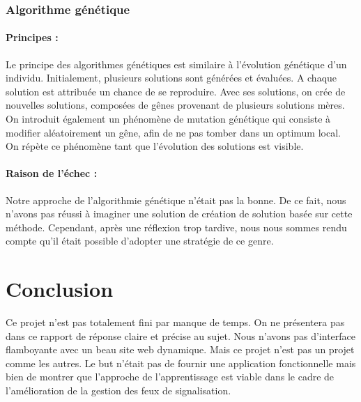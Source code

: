 \documentclass[11pt]{article}
\begin{document}
\subsubsection{Algorithme génétique}
\paragraph{Principes :}{
Le principe des algorithmes génétiques est similaire à l'évolution génétique d'un individu. Initialement, plusieurs solutions sont générées et évaluées. A chaque solution est attribuée un chance de se reproduire. Avec ses solutions, on crée de nouvelles solutions, composées de gênes provenant de plusieurs solutions mères. On introduit également un phénomène de mutation génétique qui consiste à modifier aléatoirement un gêne, afin de ne pas tomber dans un optimum local.
On répète ce phénomène tant que l'évolution des solutions est visible. 
}
\paragraph{Raison de l'échec :}{
Notre approche de l'algorithmie génétique n'était pas la bonne. De ce fait, nous n'avons pas réussi à imaginer une solution de création de solution basée sur cette méthode. Cependant, après une réflexion trop tardive, nous nous sommes rendu compte qu'il était possible d'adopter une stratégie de ce genre.
}


\section{Conclusion}
Ce projet n'est pas totalement fini par manque de temps. On ne présentera pas dans ce rapport de réponse claire et précise au sujet. Nous n'avons pas d'interface flamboyante avec un beau site web dynamique. Mais ce projet n'est pas un projet comme les autres. Le but n’était pas de fournir une application fonctionnelle mais bien de montrer que l'approche de l'apprentissage est viable dans le cadre de l'amélioration de la gestion des feux de signalisation. 
\end{document}
